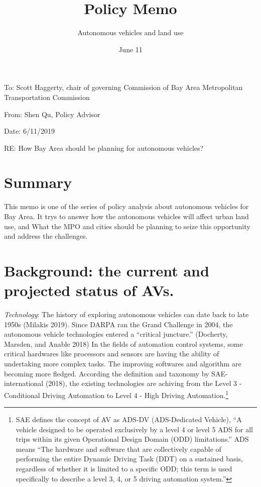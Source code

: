 \documentclass[12pt,]{article}
\title{Policy Memo}
\subtitle{Autonomous vehicles and land use}
\author{}
\date{June 11}
\let\rmarkdownfootnote\footnote%
\def\footnote{\protect\rmarkdownfootnote}
\begin{document}
\maketitle

To: Scott Haggerty, chair of governing Commission of Bay Area
Metropolitan Transportation Commission

From: Shen Qu, Policy Advisor

Date: 6/11/2019

RE: How Bay Area should be planning for autonomous vehicles?

\hypertarget{summary}{%
\section{Summary}\label{summary}}

This memo is one of the series of policy analysis about autonomous
vehicles for Bay Area. It trys to answer how the autonomous vehicles
will affect urban land use, and What the MPO and cities should be
planning to seize this opportunity and address the challenges.

\hypertarget{background-the-current-and-projected-status-of-avs.}{%
\section{Background: the current and projected status of
AVs.}\label{background-the-current-and-projected-status-of-avs.}}

\emph{Technology}: The history of exploring autonomous vehicles can date
back to late 1950s (Milakis 2019). Since DARPA ran the Grand Challenge
in 2004, the autonomous vehicle technologies entered a ``critical
juncture.'' (Docherty, Marsden, and Anable 2018) In the fields of
automation control systems, some critical hardwares like processors and
sensors are having the ability of undertaking more complex tasks. The
improving softwares and algorithm are becoming more fledged. According
the definition and taxonomy by SAE-international (2018), the existing
technologies are achiving from the Level 3 - Conditional Driving
Automation to Level 4 - High Driving Automation.\footnote{SAE defines
  the concept of AV as ADS-DV (ADS-Dedicated Vehicle), ``A vehicle
  designed to be operated exclusively by a level 4 or level 5 ADS for
  all trips within its given Operational Design Domain (ODD)
  limitations.'' ADS means ``The hardware and software that are
  collectively capable of performing the entire Dynamic Driving Task
  (DDT) on a sustained basis, regardless of whether it is limited to a
  specific ODD; this term is used specifically to describe a level 3, 4,
  or 5 driving automation system.''}
\end{document}
